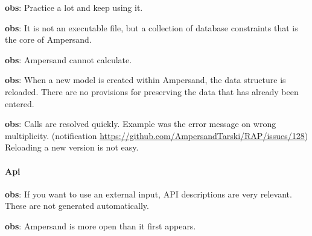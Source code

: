 \begin{obs}\label{obs:rq1-96:30-12}
    \textbf{obs}: Practice a lot and keep using it.
\end{obs}

\begin{obs}\label{obs:rq2-19:16-11}
    \textbf{obs}: It is not an executable file, but a collection of database constraints that is the core of Ampersand.
\end{obs}

\begin{obs}\label{obs:rq4-1}
    \textbf{obs}: Ampersand cannot calculate.
\end{obs}
\begin{obs}\label{obs:rq4-7}
    \textbf{obs}: When a new model is created within Ampersand, the data structure is reloaded.
    There are no provisions for preserving the data that has already been entered.
\end{obs}
\begin{obs}\label{obs:rq4-8:22-11}
    \textbf{obs}: Calls are resolved quickly.
    Example was the error message on wrong multiplicity.
    (notification \url{https://github.com/AmpersandTarski/RAP/issues/128})
    Reloading a new version is not easy.
\end{obs}

\paragraph{Api}
\begin{obs}\label{obs:rq1-8:14-11}
    \textbf{obs}: If you want to use an external input, API descriptions are very relevant.
    These are not generated automatically.
\end{obs}
    
\begin{obs}\label{obs:rq1-70:14-11}
    \textbf{obs}: Ampersand is more open than it first appears.
\end{obs}

